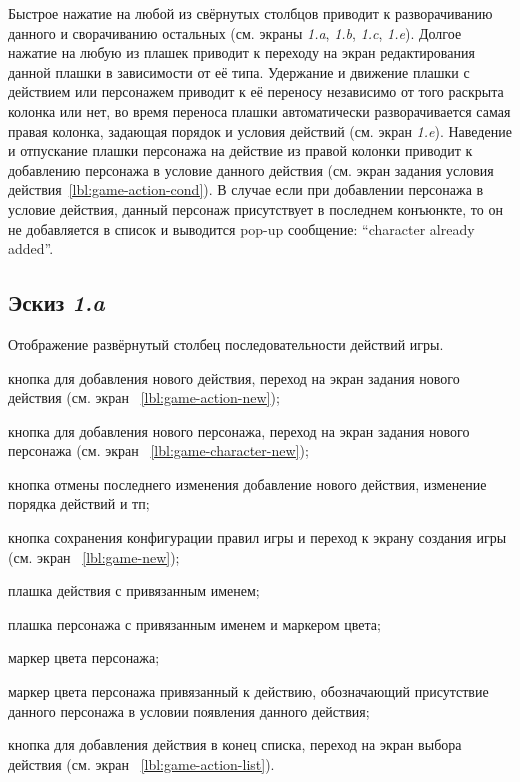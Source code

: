 Быстрое нажатие на любой из свёрнутых столбцов приводит к разворачиванию данного и сворачиванию остальных (см. экраны \emph{1.a}, \emph{1.b}, \emph{1.c}, \emph{1.e}). Долгое нажатие на любую из плашек приводит к переходу на экран редактирования данной плашки в зависимости от её типа. Удержание и движение плашки с действием или персонажем приводит к её переносу независимо от того раскрыта колонка или нет, во время переноса плашки автоматически разворачивается самая правая колонка, задающая порядок и условия действий (см. экран \emph{1.e}). Наведение и отпускание плашки персонажа на действие из правой колонки приводит к добавлению персонажа в условие данного действия (см. экран задания условия действия~\ref{lbl:game-action-cond}). В случае если при добавлении персонажа в условие действия, данный персонаж присутствует в последнем конъюнкте, то он не добавляется в список и выводится pop-up сообщение: ``character already added''.

\subsection{Эскиз \emph{1.a}}

Отображение развёрнутый столбец последовательности действий игры.

\begin{enumerate*}
    \item кнопка для добавления нового действия, переход на экран задания нового действия (см. экран ~\ref{lbl:game-action-new});
    \item кнопка для добавления нового персонажа, переход на экран задания нового персонажа (см. экран ~\ref{lbl:game-character-new});
    \item кнопка отмены последнего изменения добавление нового действия, изменение порядка действий и тп;
    \item кнопка сохранения конфигурации правил игры и переход к экрану создания игры (см. экран ~\ref{lbl:game-new});
    \item плашка действия с привязанным именем;
    \item плашка персонажа с привязанным именем и маркером цвета;
    \item маркер цвета персонажа;
    \item маркер цвета персонажа привязанный к действию, обозначающий присутствие данного персонажа в условии появления данного действия;
    \item кнопка для добавления действия в конец списка, переход на экран выбора действия (см. экран ~\ref{lbl:game-action-list}).
\end{enumerate*}

